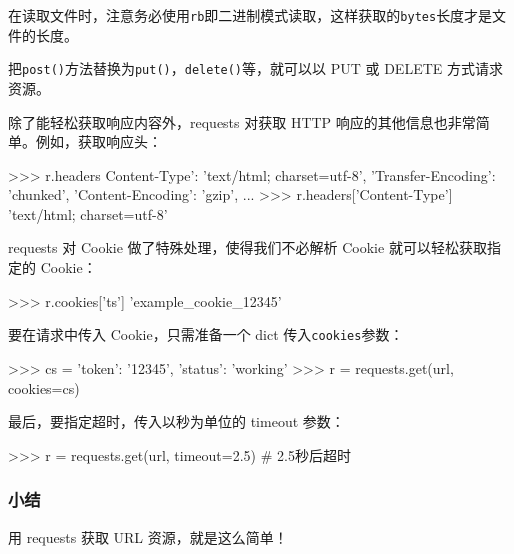 在读取文件时，注意务必使用\texttt{\textquotesingle{}rb\textquotesingle{}}即二进制模式读取，这样获取的\texttt{bytes}长度才是文件的长度。

把\texttt{post()}方法替换为\texttt{put()}，\texttt{delete()}等，就可以以
PUT 或 DELETE 方式请求资源。

除了能轻松获取响应内容外，requests 对获取 HTTP
响应的其他信息也非常简单。例如，获取响应头：

\begin{pythoncode}
>>> r.headers
{Content-Type': 'text/html; charset=utf-8', 'Transfer-Encoding': 'chunked', 'Content-Encoding': 'gzip', ...}
>>> r.headers['Content-Type']
'text/html; charset=utf-8'
\end{pythoncode}

requests 对 Cookie 做了特殊处理，使得我们不必解析 Cookie
就可以轻松获取指定的 Cookie：

\begin{pythoncode}
>>> r.cookies['ts']
'example_cookie_12345'
\end{pythoncode}

要在请求中传入 Cookie，只需准备一个 dict 传入\texttt{cookies}参数：

\begin{pythoncode}
>>> cs = {'token': '12345', 'status': 'working'}
>>> r = requests.get(url, cookies=cs)
\end{pythoncode}

最后，要指定超时，传入以秒为单位的 timeout 参数：

\begin{pythoncode}
>>> r = requests.get(url, timeout=2.5) # 2.5秒后超时
\end{pythoncode}

\hypertarget{ux5c0fux7ed3}{%
\subsubsection{小结}\label{ux5c0fux7ed3}}

用 requests 获取 URL 资源，就是这么简单！

